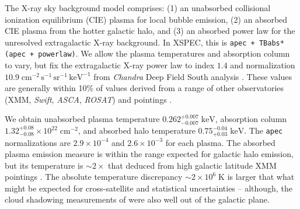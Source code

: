 \documentclass[preprint2,tighten,trackchanges]{aastex6}
\newcommand*{\mt}{\mathrm}
\newcommand*{\unit}[1]{\;\mt{#1}}  %
\newcommand*{\abt}{\mathord{\sim}} %
\begin{document}
The X-ray sky background model comprises:
(1) an unabsorbed collisional ionization equilibrium (CIE) plasma for local
bubble emission,
(2) an absorbed CIE plasma from the hotter galactic halo,
and
(3) an absorbed power law for the unresolved extragalactic X-ray background.
In XSPEC, this is \texttt{apec + TBabs*(apec + powerlaw)}.
We allow the plasma temperatures and absorption column to vary,
but fix the extragalactic X-ray power law to index $1.4$ and normalization
$10.9 \unit{cm^{-2}\, s^{-1}\, sr^{-1}\, keV^{-1}}$ from \textit{Chandra} Deep Field
South analysis \citep{hickox2006}.
These values are generally within 10\% of values derived from a range of other
observatories (XMM, \textit{Swift}, \textit{ASCA}, \textit{ROSAT}) and
pointings \citep[e.g.,][]{chen1997, kushino2002, de-luca2004, moretti2009}.

%
%
%
%
%

We obtain unabsorbed plasma temperature ${0.262}^{+0.007}_{-0.007} \unit{keV}$,
absorption column ${1.32}^{+0.08}_{-0.08} \times 10^{22} \unit{cm^{-2}}$,
and absorbed halo temperature ${0.75}^{-0.04}_{+0.03} \unit{keV}$.
The \texttt{apec} normalizations are $2.9\times10^{-4}$ and $2.6\times10^{-3}$
for each plasma.  %
The absorbed plasma emission measure is within the range expected for galactic
halo emission, but its temperature is $\abt 2\times$ that deduced from high
galactic latitude XMM pointings \citep{henley2013}.
The absolute temperature discrepancy $\abt 2 \times 10^6 \unit{K}$
is larger that what might be expected for cross-satellite and statistical
uncertainties \citep{henley2015} -- although, the cloud shadowing measurements
of \citet{henley2015} were also well out of the galactic plane.
\end{document}
